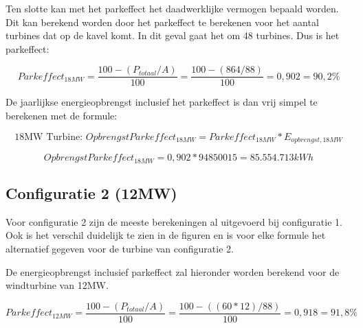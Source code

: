 Ten slotte kan met het parkeffect het daadwerklijke vermogen bepaald worden. Dit kan berekend worden door het parkeffect te berekenen voor het aantal turbines dat op de kavel komt. In dit geval gaat het om 48 turbines. Dus is het parkeffect: 

\begin{equation} \label{eq:12}
 Parkeffect_{18MW} = \frac{100-(P_{totaal}/A)}{100} = \frac{100-(864/88)}{100} = 0,902 = 90,2\%
\end{equation}

De jaarlijkse energieopbrengst inclusief het parkeffect is dan vrij simpel te berekenen met de formule: 


\begin{equation} \label{13}
\text{18MW Turbine: } OpbrengstParkeffect_{18MW}=Parkeffect_{18MW}*E_{opbrengst,18MW} 
\end{equation}

\begin{equation} \label{14}
OpbrengstParkeffect_{18MW}=0,902*94850015 = 85.554.713kWh 
\end{equation}

\subsection{Configuratie 2 (12MW)}
Voor configuratie 2 zijn de meeste berekeningen al uitgevoerd bij configuratie 1. Ook is het verschil duidelijk te zien in de figuren en is voor elke formule het alternatief gegeven voor de turbine van configuratie 2. 

De energieopbrengst inclusief parkeffect zal hieronder worden berekend voor de windturbine van 12MW. 

\begin{equation} \label{eq:15}
 Parkeffect_{12MW} = \frac{100-(P_{totaal}/A)}{100} = \frac{100-((60*12)/88)}{100} = 0,918 = 91,8\%
\end{equation}

